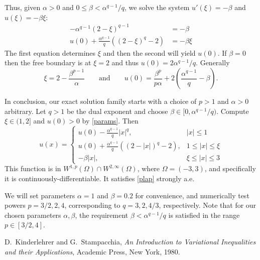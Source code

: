 \documentclass[11pt]{amsart}
\begin{document}
Thus, given $\alpha>0$ and $0 \le \beta < \alpha^{q-1}/q$, we solve the system $u'(\xi)=-\beta$ and $u(\xi)=-\beta \xi$:
\begin{align*}
-\alpha^{q-1} (2 - \xi)^{q-1} &= -\beta \\
u(0) + \frac{\alpha^{q-1}}{q} \left( (2 - \xi)^q - 2 \right) &= -\beta \xi
\end{align*}
The first equation determines $\xi$ and then the second will yield $u(0)$.  If $\beta=0$ then the free boundary is at $\xi=2$ and thus $u(0) = 2 \alpha^{q-1} / q$.  Generally
\begin{equation}
\boxed{\xi = 2 - \frac{\beta^{p-1}}{\alpha} \qquad \text{and} \qquad u(0) = \frac{\beta^p}{p \alpha} + 2 \left(\frac{\alpha^{q-1}}{q} - \beta\right).} \label{params}
\end{equation}

In conclusion, our exact solution family starts with a choice of $p>1$ and $\alpha>0$ arbitrary.  Let $q>1$ be the dual exponent and choose $\beta \in [0,\alpha^{q-1}/q)$.  Compute $\xi \in (1,2]$ and $u(0)>0$ by \eqref{params}.  Then 
\begin{equation}
\boxed{u(x) = \begin{cases} u(0) - \frac{\alpha^{q-1}}{q} |x|^q, & |x| \le 1 \\
                      u(0) + \frac{\alpha^{q-1}}{q} \left( (2 - |x|)^q - 2 \right), & 1 \le |x| \le \xi \\
                      -\beta |x|, & \xi \le |x| \le 3\end{cases}}  \label{exact}
\end{equation}
This function is in $W^{1,p}(\Omega) \cap W^{2,\infty}(\Omega)$, where $\Omega = (-3,3)$, and specifically it is continuously-differentiable.  It satisfies \eqref{plap} strongly a.e.

We will set parameters $\alpha=1$ and $\beta = 0.2$ for convenience, and numerically test powers $p=3/2,2,4$, corresponding to $q=3,2,4/3$, respectively.  Note that for our chosen parameters $\alpha,\beta$, the requirement $\beta < \alpha^{q-1}/q$ is satisfied in the range $p \in [3/2,4]$.

\begin{thebibliography}{1}

{\sc D.~Kinderlehrer and G.~Stampacchia}, {\em An {I}ntroduction to
  {V}ariational {I}nequalities and their {A}pplications}, Academic Press, New
  York, 1980.

\end{thebibliography}
\end{document}
